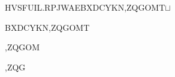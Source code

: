 \begin{tt}
\begin{small}
\begin{bundle}{}
{\begin{bundle}{HVSFUIL.RPJWAEBXDCYKN,ZQGOMT$\sqcup$}
{\begin{bundle}{BXDCYKN,ZQGOMT}
{\begin{bundle}{,ZQGOM}
{\begin{bundle}{,ZQG}
\end{bundle}}
\end{bundle}}
\end{bundle}}
\end{bundle}}
\end{bundle}
\end{small}
\end{tt}
\newpage